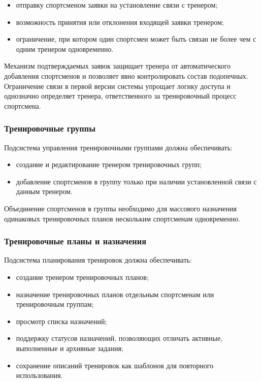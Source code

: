 \begin{itemize}
\tightlist
\item
  отправку спортсменом заявки на установление связи с тренером;
\item
  возможность принятия или отклонения входящей заявки тренером;
\item
  ограничение, при котором один спортсмен может быть связан не более чем с одним тренером одновременно.
\end{itemize}

Механизм подтверждаемых заявок защищает тренера от автоматического добавления спортсменов и позволяет явно контролировать состав подопечных. Ограничение связи в первой версии системы упрощает логику доступа и однозначно определяет тренера, ответственного за тренировочный процесс спортсмена.

\subsubsection{Тренировочные группы}

Подсистема управления тренировочными группами должна обеспечивать:

\begin{itemize}
\tightlist
\item
  создание и редактирование тренером тренировочных групп;
\item
  добавление спортсменов в группу только при наличии установленной связи с данным тренером.
\end{itemize}

Объединение спортсменов в группы необходимо для массового назначения одинаковых тренировочных планов нескольким спортсменам одновременно.

\subsubsection{Тренировочные планы и назначения}

Подсистема планирования тренировок должна обеспечивать:

\begin{itemize}
\tightlist
\item
  создание тренером тренировочных планов;
\item
  назначение тренировочных планов отдельным спортсменам или тренировочным группам;
\item
  просмотр списка назначений;
\item
  поддержку статусов назначений, позволяющих отличать активные, выполненные и архивные задания;
\item
  сохранение описаний тренировок как шаблонов для повторного использования.
\end{itemize}

